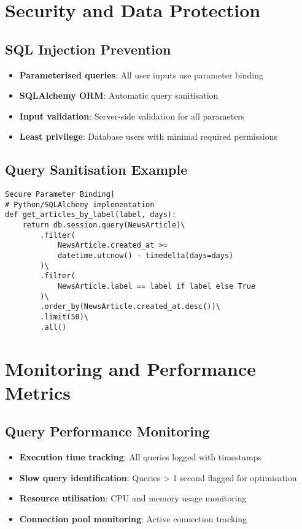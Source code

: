 \documentclass[11pt,a4paper]{article}
\begin{document}
\section{Security and Data Protection}

\subsection{SQL Injection Prevention}
\begin{itemize}
    \item \textbf{Parameterised queries}: All user inputs use parameter binding
    \item \textbf{SQLAlchemy ORM}: Automatic query sanitisation
    \item \textbf{Input validation}: Server-side validation for all parameters
    \item \textbf{Least privilege}: Database users with minimal required permissions
\end{itemize}

\subsection{Query Sanitisation Example}
\begin{verbatim}Secure Parameter Binding]
# Python/SQLAlchemy implementation
def get_articles_by_label(label, days):
    return db.session.query(NewsArticle)\
        .filter(
            NewsArticle.created_at >= 
            datetime.utcnow() - timedelta(days=days)
        )\
        .filter(
            NewsArticle.label == label if label else True
        )\
        .order_by(NewsArticle.created_at.desc())\
        .limit(50)\
        .all()
\end{verbatim}

\section{Monitoring and Performance Metrics}

\subsection{Query Performance Monitoring}
\begin{itemize}
    \item \textbf{Execution time tracking}: All queries logged with timestamps
    \item \textbf{Slow query identification}: Queries > 1 second flagged for optimisation
    \item \textbf{Resource utilisation}: CPU and memory usage monitoring
    \item \textbf{Connection pool monitoring}: Active connection tracking
\end{itemize}
\end{document}

